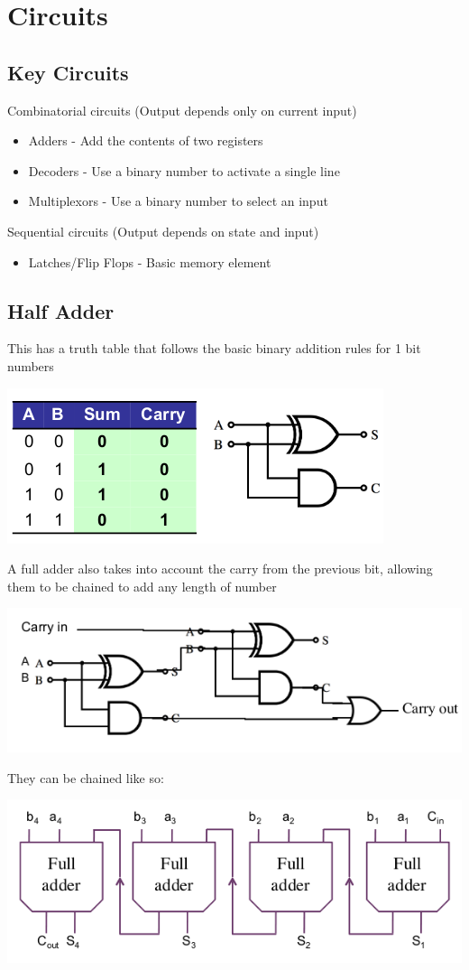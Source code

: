 \documentclass{article}[18pt]
\begin{document}
\section{Circuits}
\subsection{Key Circuits}
Combinatorial circuits (Output depends only on current input)
\begin{itemize}
	\item Adders - Add the contents of two registers
	\item Decoders - Use a binary number to activate a single line
	\item Multiplexors - Use a binary number to select an input
\end{itemize}
Sequential circuits (Output depends on state and input)
\begin{itemize}
	\item Latches/Flip Flops - Basic memory element
\end{itemize}
\subsection{Half Adder}
This has a truth table that follows the basic binary addition rules for 1 bit numbers
\begin{center}
	\includegraphics[scale=0.7]{"Half Adder"}
\end{center}
A full adder also takes into account the carry from the previous bit, allowing them to be chained to add any length of number
\begin{center}
	\includegraphics[scale=0.7]{Adder}
\end{center}
They can be chained like so:
\begin{center}
	\includegraphics[scale=0.7]{"Chaining Adders"}
\end{center}
\end{document}
